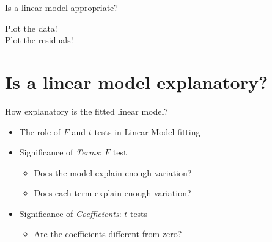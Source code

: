 \documentclass[xcolor=x11names,handout,compress]{beamer}
\renewcommand{\(}{\begin{columns}}
\renewcommand{\)}{\end{columns}}
\newcommand{\<}[1]{\begin{column}{#1}}
\renewcommand{\>}{\end{column}}
\begin{document}

\begin{frame}{Is a linear model appropriate?}

\begin{center} 
    \Huge
Plot the data!\\
Plot the residuals!
\end{center}

\end{frame}


\section{Is a linear model explanatory?}

\begin{frame}{How explanatory is the fitted linear model?}

\begin{center}
\begin{itemize}[<+->]\itemsep20pt
\item The role of $F$ and $t$ tests in Linear Model fitting
\item Significance of {\it Terms}: $F$ test
\begin{itemize}
    \item Does the model explain enough variation?
    \item Does each term explain enough variation?
\end{itemize}
\item Significance of {\it Coefficients}: $t$ tests
\begin{itemize}
    \item Are the coefficients different from zero?
\end{itemize}
\end{itemize}

\end{center}
\end{frame}

\end{document}
